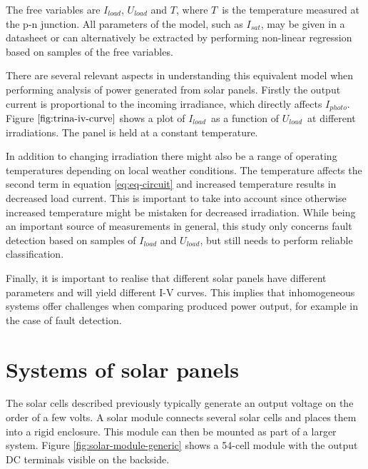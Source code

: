 The free variables are $I_{load}$, $U_{load}$ and $T$, where $T$ is the temperature measured at the p-n junction.
All parameters of the model, such as $I_{sat}$, may be given in a datasheet or can alternatively be extracted by performing non-linear regression based on samples of the free variables\cite{Walker2001}.

There are several relevant aspects in understanding this equivalent model when performing analysis of power generated from solar panels.
Firstly the output current is proportional to the incoming irradiance, which directly affects $I_{photo}$.
Figure $\ref{fig:trina-iv-curve}$ shows a plot of $I_{load}$ as a function of $U_{load}$ at different irradiations.
The panel is held at a constant temperature.


In addition to changing irradiation there might also be a range of operating temperatures depending on local weather conditions.
The temperature affects the second term in equation \ref{eq:eq-circuit} and increased temperature results in decreased load current.
This is important to take into account since otherwise increased temperature might be mistaken for decreased irradiation.
While being an important source of measurements in general, this study only concerns fault detection based on samples of $I_{load}$ and $U_{load}$, but still needs to perform reliable classification.

Finally, it is important to realise that different solar panels have different parameters and will yield different I-V curves.
This implies that inhomogeneous systems offer challenges when comparing produced power output, for example in the case of fault detection.

\section{Systems of solar panels}
The solar cells described previously typically generate an output voltage on the order of a few volts.
A solar module connects several solar cells and places them into a rigid enclosure.
This module can then be mounted as part of a larger system.
Figure \ref{fig:solar-module-generic} shows a 54-cell module with the output DC terminals visible on the backside.


